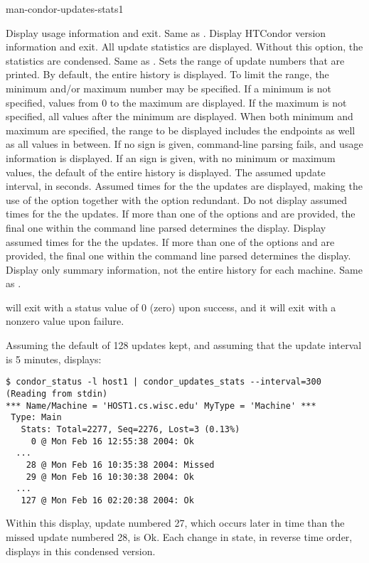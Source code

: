 \begin{ManPage}{}{man-condor-updates-stats}{1}
\begin{Options}
    {Display usage information and exit. }
    {Same as .  }
    {Display HTCondor version information and exit. }
    {All update statistics are displayed.
    Without this option, the statistics are condensed.}
    {Same as .  }
   {Sets the
    range of update numbers that
    are printed.  By default, the entire history is displayed.
    To limit the range, the minimum and/or maximum
    number may be specified.
    If a minimum is not specified, values from 0 to the maximum
    are displayed.
    If the maximum is not specified, all values after the minimum
    are displayed.
    When both minimum and maximum are specified, the range
    to be displayed includes the endpoints as well as all
    values in between.
    If no \eq{} sign is given, command-line parsing fails,
    and usage information is displayed.
    If an  \eq{} sign is given, with no minimum or maximum values,
    the default of the entire history is displayed.}
   {The assumed update
    interval, in seconds.
    Assumed times for the the updates are displayed, making the
    use of the  option together with 
    the  option redundant.}
   {Do not display assumed times for the
    the updates.
    If more than one of the options  and 
    are provided, the final one within the command line parsed
    determines the display.  }
   {Display assumed times for the the updates.
    If more than one of the options  and 
    are provided, the final one within the command line parsed
    determines the display.  }
   {Display only summary
    information, not the entire history for each machine.  }
    {Same as .  }
\end{Options}

\ExitStatus

 will exit with a status value of 0 (zero) upon success,
and it will exit with a nonzero value upon failure.

\Examples
Assuming the default of 128 updates kept, 
and assuming that the update interval is 5 minutes,
 displays: 
\footnotesize
\begin{verbatim}
$ condor_status -l host1 | condor_updates_stats --interval=300
(Reading from stdin)
*** Name/Machine = 'HOST1.cs.wisc.edu' MyType = 'Machine' ***
 Type: Main
   Stats: Total=2277, Seq=2276, Lost=3 (0.13%)
     0 @ Mon Feb 16 12:55:38 2004: Ok
  ...
    28 @ Mon Feb 16 10:35:38 2004: Missed
    29 @ Mon Feb 16 10:30:38 2004: Ok
  ...
   127 @ Mon Feb 16 02:20:38 2004: Ok
\end{verbatim}
\normalsize

Within this display, update numbered 27, which occurs later in time
than the missed update numbered 28, is Ok.
Each change in state, in reverse time order, displays in this
condensed version.
\normalsize


\end{ManPage}
